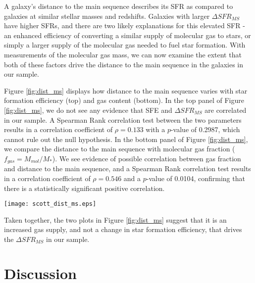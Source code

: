 \documentclass[a4paper,fleqn,usenatbib]{mnras}
\begin{document}
A galaxy's distance to the main sequence describes its SFR as compared to galaxies at similar stellar masses and redshifts. Galaxies with larger $\Delta SFR_{MS}$ have higher SFRs, and there are two likely explanations for this elevated SFR - an enhanced efficiency of converting a similar supply of molecular gas to stars, or simply a larger supply of the molecular gas needed to fuel star formation. With measurements of the molecular gas mass, we can now examine the extent that both of these factors drive the distance to the main sequence in the galaxies in our sample. 

Figure \ref{fig:dist_ms} displays how distance to the main sequence varies with star formation efficiency (top) and gas content (bottom). In the top panel of Figure \ref{fig:dist_ms}, we do not see any evidence that SFE and $\Delta SFR_{MS}$ are correlated in our sample. A Spearman Rank correlation test between the two parameters results in a correlation coefficient of $\rho = 0.133$ with a $p$-value of 0.2987, which cannot rule out the null hypothesis. In the bottom panel of Figure \ref{fig:dist_ms}, we compare the distance to the main sequence with molecular gas fraction ($f_{gas} = M_{mol}/M_{*}$). We see evidence of possible correlation between gas fraction and distance to the main sequence, and a Spearman Rank correlation test results in a correlation coefficient of $\rho = 0.546$ and a $p$-value of 0.0104, confirming that there is a statistically significant positive correlation. 

\begin{figure*}
\centering
\texttt{[image: scott\_dist\_ms.eps]}
\caption{A comparison of SFE (top panel) and gas fraction (bottom panel) with distance to the main sequence. Circles and stars again distinguish SFGs and AGN. We find no statistically significant correlation between SFE and distance to the main sequence, but we do find statistically significant correlation between gas fraction and distance to the main sequence (bottom). The best fit power-law relationship, $M_{mol} / M_{*} \propto (SFR/SFR_{MS})^{0.58 \pm 0.23}$, is plotted as the red dashed line.}
\label{fig:dist_ms}
\end{figure*}

Taken together, the two plots in Figure \ref{fig:dist_ms} suggest that it is an increased gas supply, and not a change in star formation efficiency, that drives the $\Delta SFR_{MS}$ in our sample. 

\section{Discussion}\label{sec:discussion}
\end{document}
